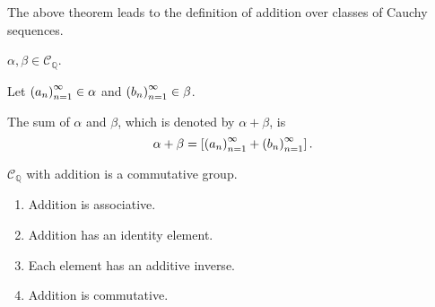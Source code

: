 The above theorem leads to the definition of addition over classes of Cauchy sequences.

\begin{definition}
    $\alpha, \beta\in\mathscr{C}_{\mathbb{Q}}$.

    Let ${\left({a_{n}}\right)}^{\infty}_{n=1}\in\alpha$ and ${\left({b_{n}}\right)}^{\infty}_{n=1}\in\beta$.

    The sum of $\alpha$ and $\beta$, which is denoted by $\alpha + \beta$, is
    \[
        \alpha + \beta = \left[{{\left({a_{n}}\right)}^{\infty}_{n=1} + {\left({b_{n}}\right)}^{\infty}_{n=1}}\right].
    \]
\end{definition}

\begin{theorem}
    $\mathscr{C}_{\mathbb{Q}}$ with addition is a commutative group.
    \begin{enumerate}[label={(F\arabic*)},itemsep=0pt,topsep=0pt]
        \item Addition is associative.
        \item Addition has an identity element.
        \item Each element has an additive inverse.
        \item Addition is commutative.
    \end{enumerate}
\end{theorem}

